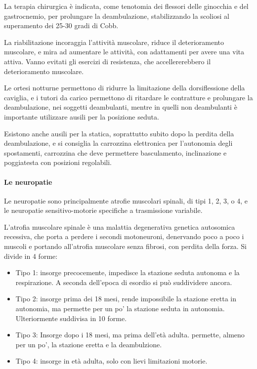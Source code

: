 La terapia chirurgica è indicata, come tenotomia dei flessori delle ginocchia e del gastrocnemio, per prolungare la deambulazione,
stabilizzando la scoliosi al superamento dei 25-30 gradi di Cobb.

La riabilitazione incoraggia l'attività muscolare, riduce il deterioramento muscolare, e mira ad aumentare le attività, con adattamenti
per avere una vita attiva. Vanno evitati gli esercizi di resistenza, che accellererebbero il deterioramento muscolare.

Le ortesi notturne permettono di ridurre la limitazione della dorsiflessione della caviglia, e i tutori da carico permettono di
ritardare le contratture e prolungare la deambulazione, nei soggetti deambulanti, mentre in quelli non deambulanti è importante
utilizzare ausili per la posizione seduta.

Esistono anche ausili per la statica, soprattutto subito dopo la perdita della deambulazione, e si consiglia la carrozzina elettronica
per l'autonomia degli spostamenti, carrozzina che deve permettere basculamento, inclinazione e poggiatesta con posizioni regolabili.

\paragraph{Le neuropatie}
Le neuropatie sono principalmente atrofie muscolari spinali, di tipi 1, 2, 3, o 4, e le neuropatie sensitivo-motorie specifiche a
trasmissione variabile.

L'atrofia muscolare spinale è una malattia degenerativa genetica autosomica recessiva, che porta a perdere i secondi motoneuroni,
denervando poco a poco i muscoli e portando all'atrofia muscolare senza fibrosi, con perdita della forza.
Si divide in 4 forme:
\begin{itemize}
\item Tipo 1: insorge precocemente, impedisce la stazione seduta autonoma e la respirazione. A seconda dell'epoca di esordio si può
suddividere ancora.
\item Tipo 2: insorge prima dei 18 mesi, rende impossibile la stazione eretta in autonomia, ma permette per un po' la stazione seduta in
autonomia. Ulteriormente suddivisa in 10 forme.
\item Tipo 3: Insorge dopo i 18 mesi, ma prima dell'età adulta. permette, almeno per un po', la stazione eretta e la deambulzione.
\item Tipo 4: insorge in età adulta, solo con lievi limitazioni motorie.
\end{itemize}

